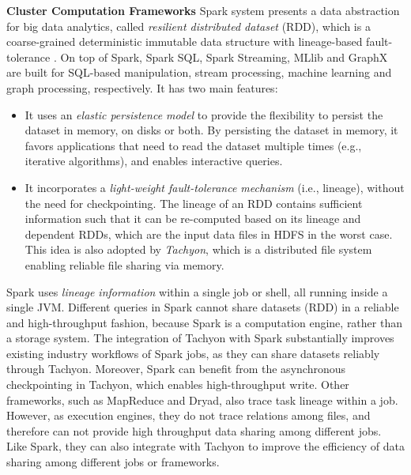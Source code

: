 \documentclass[twocolumn]{article}
\begin{document}
\noindent
\textbf{Cluster Computation Frameworks}
Spark system presents a data abstraction for big data analytics, called \textit{resilient distributed dataset} (RDD), 
which is a coarse-grained deterministic immutable data structure with lineage-based fault-tolerance \cite{RDD:2012}. 
On top of Spark, Spark SQL, Spark Streaming, MLlib and GraphX are built for SQL-based manipulation, stream processing, machine learning and graph processing, respectively. It has two main features:

\begin{itemize}
\item
  It uses an \textit{elastic persistence model} to provide the flexibility to
  persist the dataset in memory, on disks or both. By persisting the
  dataset in memory, it favors applications that need to read the
  dataset multiple times (e.g., iterative algorithms), and enables
  interactive queries.
\item
  It incorporates a \textit{light-weight fault-tolerance mechanism} (i.e., lineage), without the need for checkpointing. 
  The lineage of an RDD contains sufficient information such that it can be re-computed based on its lineage and dependent RDDs, which are the input data files in HDFS in the worst case. 
This  idea is also adopted by \emph{Tachyon}, which is a distributed file system enabling reliable file sharing via memory.
\end{itemize}
 
Spark uses \textit{lineage information} within a single job or shell, all running inside a single JVM. 
Different queries in Spark cannot share datasets (RDD) in a reliable and high-throughput fashion, 
because Spark is a computation engine, rather than a storage system. 
The integration of Tachyon with Spark substantially improves existing industry workflows of Spark jobs, 
as they can share datasets reliably through Tachyon. 
Moreover, Spark can benefit from the asynchronous checkpointing in Tachyon, which enables high-throughput write.
Other frameworks, such as MapReduce and Dryad, also trace task lineage within a job. 
However, as execution engines, they do not trace relations among files, 
and therefore can not provide high throughput data sharing among different jobs. 
Like Spark, they can also integrate with Tachyon to improve the efficiency of data sharing among different jobs or frameworks.
\end{document}
